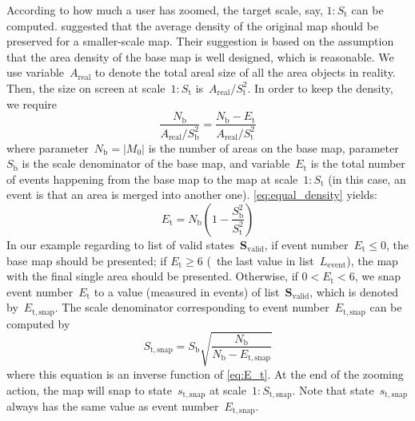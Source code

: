 \documentclass[twocolumn]{svjour3}          %
\begin{document}
According to how much a user has zoomed,
the target scale, say, $1:S_\mathrm{t}$ can be computed.
\citet{Huang2016Webmap} suggested that 
the average density of the original map should be preserved 
for a smaller-scale map.
Their suggestion is based on the assumption that 
the area density of the base map is well designed, which is reasonable.
We use variable~$A_\mathrm{real}$ to denote the total areal size of 
all the area objects in reality.
Then, the size on screen at scale~$1:S_\mathrm{t}$ 
is~$A_\mathrm{real} \big/ S^2_\mathrm{t}$.
In order to keep the density, we require
\begin{equation}
\label{eq:equal_density}
\frac{N_\mathrm{b}}{A_\mathrm{real} \big/ S^2_\mathrm{b}} =
\frac{N_\mathrm{b}-E_\mathrm{t}}{A_\mathrm{real} \big/ S^2_\mathrm{t}}
\end{equation}
where parameter~$N_\mathrm{b} = |M_0|$ 
is the number of areas on the base map,
parameter~$S_\mathrm{b}$ is the scale denominator of the base map,
and variable~$E_\mathrm{t}$ is the total number of events 
happening from the base map to the map at scale~$1:S_\mathrm{t}$
(in this case, an event is that an area is merged into another one).
\eq\ref{eq:equal_density} yields:
\begin{equation}
\label{eq:E_t}
E_\mathrm{t} = N_\mathrm{b} \left(1-\frac{S^2_\mathrm{b}}{S^2_\mathrm{t}}\right)
\end{equation}
In our example regarding to list of 
valid states~$\mathrm{\mathrm{\textbf{S}_{valid}}}$,
if event number~$E_\mathrm{t} \le 0$, the base map should be presented;
if $E_\mathrm{t} \ge 6$ (\ie~the last value in list~$L_\mathrm{event}$),
the map with the final single area should be presented.
Otherwise, if $0<E_\mathrm{t} < 6$, we snap event number~$E_\mathrm{t}$ 
to a value (measured in events) of 
list~$\mathrm{\textbf{S}_{valid}}$,
which is denoted by~$E_\mathrm{t,snap}$.
The scale denominator corresponding to event number~$E_\mathrm{t,snap}$
can be computed by 
\begin{equation}
\label{eq:S_t_snap}
S_\mathrm{t,snap} = S_\mathrm{b} \sqrt{\frac{N_\mathrm{b}}{N_\mathrm{b}-E_\mathrm{t,snap}}}
\end{equation}
where this equation is an inverse function of \eq\ref{eq:E_t}.
At the end of the zooming action, 
the map will snap to state~$s_\mathrm{t,snap}$
at scale~$1:S_\mathrm{t,snap}$.
Note that state~$s_\mathrm{t,snap}$ always has 
the same value as event number~$E_\mathrm{t,snap}$.
\end{document}

